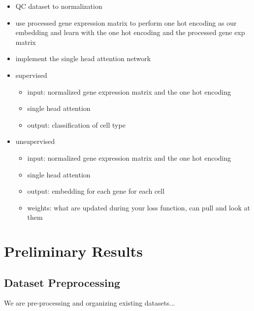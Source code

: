\documentclass{article}
\begin{document}
\begin{itemize}

\item QC dataset to normalization
\item use processed gene expression matrix to perform one hot encoding as our embedding and learn with the one hot encoding and the processed gene exp matrix

\item implement the single head attention network

\item supervised

  \begin{itemize}
    \item input: normalized gene expression matrix and the one hot encoding
    \item single head attention
    \item output: classification of cell type
  \end{itemize}
  
  \item unsupervised
    \begin{itemize}
      \item input: normalized gene expression matrix and the one hot encoding
      \item single head attention
      \item output: embedding for each gene for each cell
      \item weights: what are updated during your loss function, can pull and look at them
    \end{itemize}

\end{itemize}

\section{Preliminary Results}

\subsection{Dataset Preprocessing}

We are pre-processing and organizing existing datasets...
\end{document}
